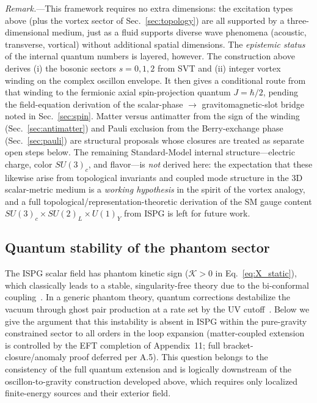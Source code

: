 \documentclass[aps,prd,onecolumn,superscriptaddress,nofootinbib,showpacs,12pt,notitlepage]{revtex4-2}
\begin{document}
\textit{Remark.}---This framework requires no extra
dimensions: the excitation types above (plus the vortex
sector of Sec.~\ref{sec:topology}) are all supported by a
three-dimensional medium, just as a fluid supports
diverse wave phenomena (acoustic, transverse, vortical)
without additional spatial dimensions.  The
\emph{epistemic status} of the internal quantum numbers
is layered, however.  The construction above derives
(i) the bosonic sectors $s=0,1,2$ from SVT and
(ii) integer vortex winding on the complex oscillon
envelope.  It then gives a conditional route from that
winding to the fermionic axial spin-projection quantum
$J=\hbar/2$, pending the field-equation derivation of
the scalar-phase $\to$ gravitomagnetic-slot bridge noted
in Sec.~\ref{sec:spin}.  Matter versus antimatter from
the sign of the winding (Sec.~\ref{sec:antimatter}) and
Pauli exclusion from the Berry-exchange phase
(Sec.~\ref{sec:pauli}) are structural proposals whose
closures are treated as separate open steps below.  The
remaining Standard-Model internal structure---electric
charge, color $SU(3)_c$, and flavor---is \emph{not}
derived here: the expectation that these likewise arise
from topological invariants and coupled mode structure in
the 3D scalar-metric medium is a \emph{working
hypothesis} in the spirit of the vortex analogy, and a
full topological/representation-theoretic derivation of
the SM gauge content $SU(3)_c\times SU(2)_L\times U(1)_Y$
from ISPG is left for future work.

\subsection{Quantum stability of the phantom sector}
\label{sec:stability}

The ISPG scalar field has phantom kinetic sign ($\mathcal{K} > 0$
in Eq.~\ref{eq:X_static}), which classically leads to a stable,
singularity-free theory due to the bi-conformal
coupling~\cite{Lotishvili2026}.  In a generic phantom theory,
quantum corrections destabilize the vacuum through ghost pair
production at a rate set by the UV
cutoff~\cite{Carroll2003,Cline2004}.  Below we give the
argument that this instability is absent in ISPG within the
pure-gravity constrained sector to all orders in the loop
expansion (matter-coupled extension is controlled by the EFT
completion of Appendix~11; full bracket-closure/anomaly proof
deferred per A.5).  This question belongs to the
consistency of the full quantum extension and is logically
downstream of the oscillon-to-gravity construction developed
above, which requires only localized finite-energy sources and
their exterior field.
\end{document}
